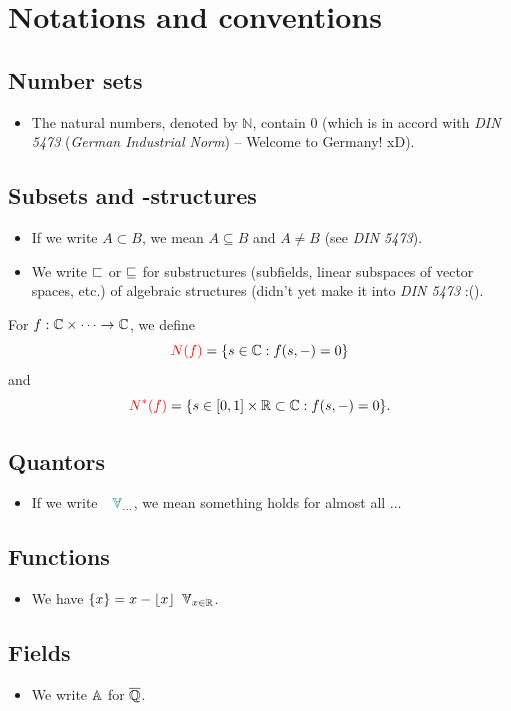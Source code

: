 \documentclass{Vorlesungstemplate_English} %
\newcommand{\Nzero}{\mathbb{N}}
\begin{document}
\chapter*{Notations and conventions}
\section*{Number sets}
\begin{itemize}
  \item The natural numbers, denoted by $\Nzero$, contain $0$ (which is in accord with \emph{DIN 5473} (\emph{German Industrial Norm}) -- Welcome to Germany! xD).
\end{itemize}
\section*{Subsets and -structures}
\begin{itemize}
  \item If we write $A \subset B$, we mean $A \subseteq B$ and $A \neq B$ (see \emph{DIN 5473}).
  \item We write $\subspace$ or $\subspaceeq$ for substructures (subfields, linear subspaces of vector spaces, etc.) of algebraic structures (didn't yet make it into \emph{DIN 5473} :().
\end{itemize}
For $f: \C \times \cdots \to \C$, we define
\[ \index{$N(f)$}{\color{red} N(f)} = \{ s \in \C: f(s, -) = 0\}\]
and
\[ \index{$N^*(f)$}{\color{red} N^*(f)} = \{ s \in [0,1] \times \R \subset \C: f(s, -) = 0\}.\]
\section*{Quantors}
\begin{itemize}
  \item If we write $\jubelforall_{\dots}$, we mean something holds for almost all $\dots$
\end{itemize}
\section*{Functions}
\begin{itemize}
  \item We have $\{ x \} = x-\lf x\rf \forall_{x \in \R}$.
\end{itemize}
\section*{Fields}
\begin{itemize}
  \item We write $\AA$ for $\overline{\Q}$.
\end{itemize}
\end{document}
